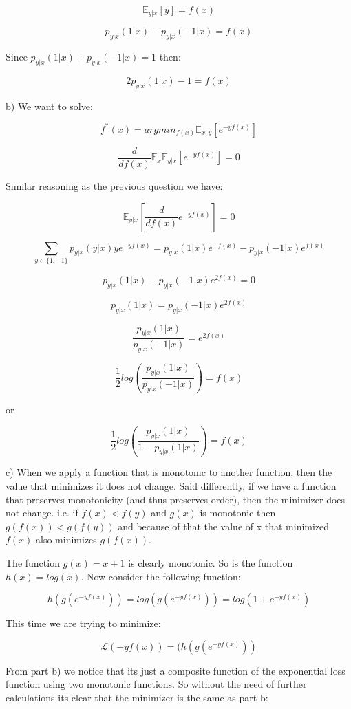\documentclass[12pt]{report}
\begin{document}
$$\mathbb{E}_{y|x}[y] = f(x) $$

$$p_{y|x}(1|x) - p_{y|x}(-1|x) = f(x)$$

Since $p_{y|x}(1|x) + p_{y|x}(-1|x) = 1$ then:

$$2p_{y|x}(1|x) - 1 = f(x) $$

b) We want to solve:

$$f^{*}(x) =  argmin_{f(x)} \mathbb{E}_{x,y}[e^{-yf(x)}]$$

$$\frac{d}{df(x)}\mathbb{E}_{x}\mathbb{E}_{y|x} [e^{-yf(x)}] = 0 $$

Similar reasoning as the previous question we have:

$$\mathbb{E}_{y|x} \left[ \frac{d}{df(x)}e^{-yf(x)} \right] = 0 $$

$$\sum_{y \in \{1, -1 \}}p_{y|x}(y|x)ye^{-yf(x)} = p_{y|x}(1|x)e^{-f(x)} - p_{y|x}(-1|x)e^{f(x)}$$

$$p_{y|x}(1|x) - p_{y|x}(-1|x)e^{2f(x)} = 0$$

$$p_{y|x}(1|x) = p_{y|x}(-1|x)e^{2f(x)}$$

$$\frac{p_{y|x}(1|x)}{p_{y|x}(-1|x)} = e^{2f(x)}$$

$$\frac{1}{2}log\left( \frac{p_{y|x}(1|x)}{p_{y|x}(-1|x)} \right) = f(x)$$

or 

$$\frac{1}{2}log\left( \frac{p_{y|x}(1|x)}{1 - p_{y|x}(1|x)} \right) = f(x)$$

c) When we apply a function that is monotonic to another function, then the value that minimizes it does not change. Said differently, if we have a function that preserves monotonicity (and thus preserves order), then the minimizer does not change. i.e. if $f(x) < f(y)$ and $g(x)$ is monotonic then $ g( f(x) ) < g( f(y) )$ and because of that the value of x that minimized $f(x)$ also minimizes $g(f(x))$.

The function $g(x) = x + 1$ is clearly monotonic. So is the function $h(x) = log(x)$. Now consider the following function:

$$h(g(e^{-yf(x)})) = log(g( e^{-yf(x)} )) = log(1 + e^{-yf(x)})$$

This time we are trying to minimize:

$$\mathcal{L}(-yf(x)) = (h(g(e^{-yf(x)}))$$

From part b) we notice that its just a composite function of the exponential loss function using two monotonic functions. So without the need of further calculations its clear that the minimizer is the same as part b:
\end{document}
